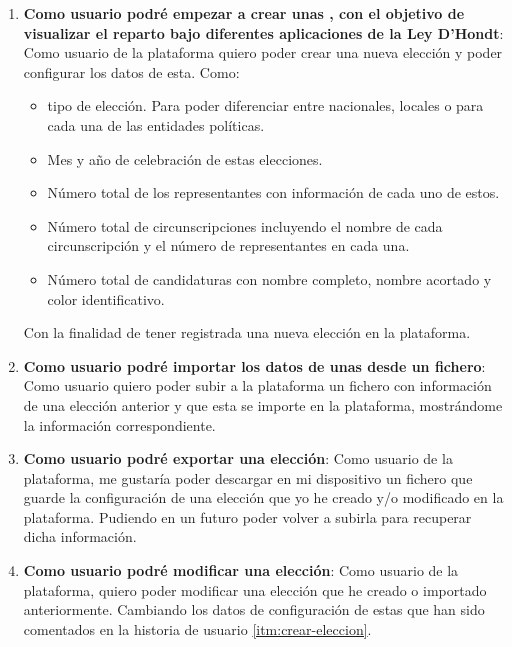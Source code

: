 \documentclass{article}
\begin{document}
        \begin{enumerate}[label=HU-\arabic*]
        	\item\label{itm:crear-eleccion} \textbf{\large Como usuario podré empezar a crear unas , con el objetivo de visualizar el reparto bajo diferentes aplicaciones de la Ley D'Hondt}: Como usuario de la plataforma quiero poder crear una nueva elección y poder configurar los datos de esta. Como:
					\begin{itemize}
						\item tipo de elección. Para poder diferenciar entre nacionales, locales o para cada una de las entidades políticas.
						\item Mes y año de celebración de estas elecciones.
						\item Número total de los representantes con información de cada uno de estos.
						\item Número total de circunscripciones incluyendo el nombre de cada circunscripción y el número de representantes en cada una.
						\item Número total de candidaturas con nombre completo, nombre acortado y color identificativo.
					\end{itemize} 
            Con la finalidad de tener registrada una nueva elección en la plataforma.
            \item\label{itm:importar-eleccion} \textbf{\large Como usuario podré importar los datos de unas  desde un fichero}: Como usuario quiero poder subir a la plataforma un fichero con información de una elección anterior y que esta se importe en la plataforma, mostrándome la información correspondiente.
            \item\label{itm:exportar-eleccion} \textbf{\large Como usuario podré exportar una elección}: Como usuario de la plataforma, me gustaría poder descargar en mi dispositivo un fichero que guarde la configuración de una elección que yo he creado y/o modificado en la plataforma. Pudiendo en un futuro poder volver a subirla para recuperar dicha información.
            \item\label{itm:modificar-eleccion} \textbf{\large Como usuario podré modificar una elección}: Como usuario de la plataforma, quiero poder modificar una elección que he creado o importado anteriormente. Cambiando los datos de configuración de estas que han sido comentados en la historia de usuario \ref{itm:crear-eleccion}.

\end{enumerate}
\end{document}
